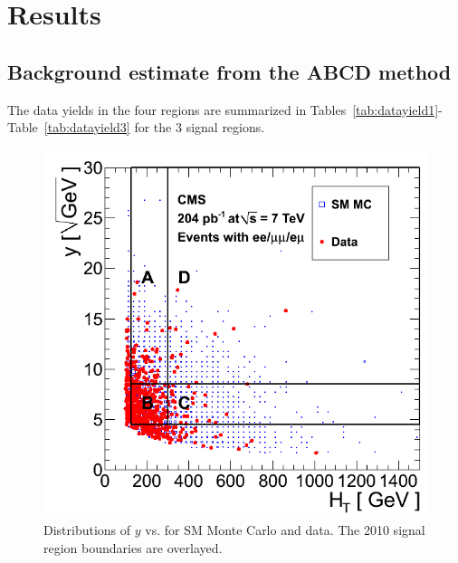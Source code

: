 
\section{Results}
\label{sec:results}

\subsection{Background estimate from the ABCD method}
\label{sec:abcdres}

The data yields in the 
four regions are summarized in Tables~\ref{tab:datayield1}-Table~\ref{tab:datayield3}
for the 3 signal regions.

\newpage

\begin{figure}[tbh]
\begin{center}
\includegraphics[width=0.7\linewidth]{plots/abcd_204pb_2010.png}
\caption{\label{fig:abcdData1}\protect Distributions of $y$ 
vs. \Ht for SM Monte Carlo and data. The 2010 signal region boundaries are overlayed.}
\end{center}
\end{figure}

